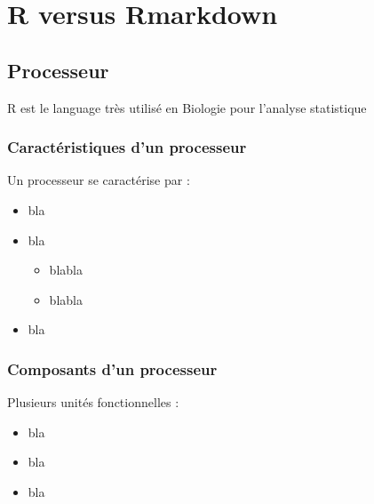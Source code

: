 \section{R versus Rmarkdown}
\subsection{Processeur}

R est le language très utilisé en Biologie pour l'analyse statistique











\begin{frame}
  \frametitle{Caractéristiques d'un processeur}
  Un processeur se caractérise par :
  \begin{itemize}
    \item bla
    \item bla
    \begin{itemize}
    \item blabla
    \item blabla
    \end{itemize}
    \item bla
  \end{itemize}
\end{frame}

\begin{frame}
  \frametitle{Composants d'un processeur}
  Plusieurs unités fonctionnelles :
  \begin{itemize}
    \item bla
    \item bla
    \item bla
  \end{itemize}
\end{frame}